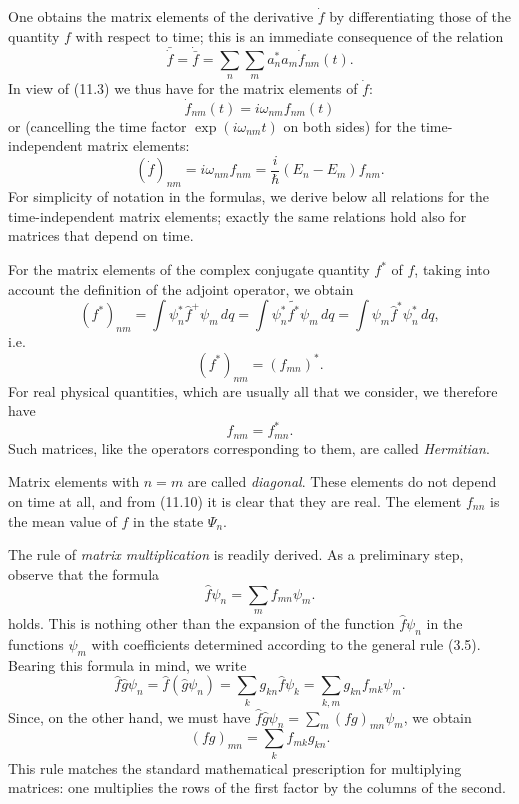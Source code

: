 One obtains the matrix elements of the derivative $\dot f$ by differentiating
those of the quantity $f$ with respect to time; this is an immediate consequence
of the relation
\begin{equation}
  \bar{\dot f}=\dot{\bar f}
  =\sum_n\sum_m a_n^*a_m\dot f_{nm}(t).
  \tag{11.6}
\end{equation}
In view of (11.3) we thus have for the matrix elements of $\dot f$:
\begin{equation}
  \dot f_{nm}(t)=i\omega_{nm}f_{nm}(t)
  \tag{11.7}
\end{equation}
or (cancelling the time factor $\exp(i\omega_{nm}t)$ on both sides) for the
time-independent matrix elements:
\begin{equation}
  (\dot f)_{nm}=i\omega_{nm}f_{nm}
  =\frac{i}{\hbar}(E_n-E_m)f_{nm}.
  \tag{11.8}
\end{equation}
For simplicity of notation in the formulas, we derive below all relations for
the time-independent matrix elements; exactly the same relations hold also for
matrices that depend on time.

For the matrix elements of the complex conjugate quantity $f^*$ of $f$, taking
into account the definition of the adjoint operator, we obtain
\[
  (f^*)_{nm}=\int\psi_n^*\hat f^+\psi_m\,dq
  =\int\psi_n^*\tilde{f^*}\psi_m\,dq
  =\int\psi_m\hat f^*\psi_n^*\,dq,
\]
i.e.
\begin{equation}
  (f^*)_{nm}=(f_{mn})^*.
  \tag{11.9}
\end{equation}
For real physical quantities, which are usually all that we
consider, we therefore have
\begin{equation}
  f_{nm}=f_{mn}^*.
  \tag{11.10}
\end{equation}
Such matrices, like the operators corresponding to them, are called
\textit{Hermitian}.

Matrix elements with $n=m$ are called \textit{diagonal}. These elements do not
depend on time at all, and from (11.10) it is clear that they are real. The
element $f_{nn}$ is the mean value of $f$ in the state $\Psi_n$.

The rule of \textit{matrix multiplication} is readily derived. As a preliminary
step, observe that the formula
\begin{equation}
  \hat f\psi_n=\sum_m f_{mn}\psi_m.
  \tag{11.11}
\end{equation}
holds. This is nothing other than the expansion of the function $\hat f\psi_n$
in the functions $\psi_m$ with coefficients determined according to the general
rule (3.5). Bearing this formula in mind, we write
\[
  \hat f\hat g\psi_n=\hat f(\hat g\psi_n)
  =\sum_k g_{kn}\hat f\psi_k=\sum_{k,m}g_{kn}f_{mk}\psi_m.
\]
Since, on the other hand, we must have
$\hat f\hat g\psi_n=\sum_m(fg)_{mn}\psi_m$, we obtain
\begin{equation}
  (fg)_{mn}=\sum_k f_{mk}g_{kn}.
  \tag{11.12}
\end{equation}
This rule matches the standard mathematical prescription for multiplying
matrices: one multiplies the rows of the first factor by the columns of
the second.

